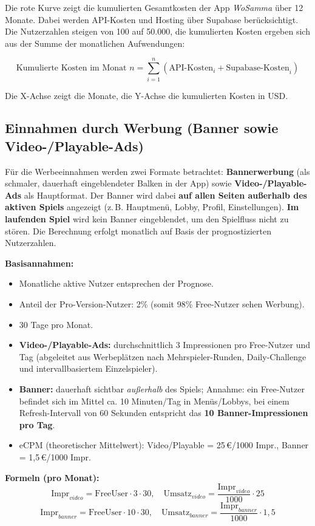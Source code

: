 Die rote Kurve zeigt die kumulierten Gesamtkosten der App \textit{WoSamma} über 12 Monate. 
Dabei werden API-Kosten und Hosting über Supabase berücksichtigt. 
Die Nutzerzahlen steigen von 100 auf 50.000, die kumulierten Kosten ergeben sich aus der Summe der monatlichen Aufwendungen:

\[
\text{Kumulierte Kosten im Monat } n = \sum_{i=1}^{n} (\text{API-Kosten}_i + \text{Supabase-Kosten}_i)
\]

Die X-Achse zeigt die Monate, die Y-Achse die kumulierten Kosten in USD.

\subsection{Einnahmen durch Werbung (Banner sowie Video-/Playable-Ads)}
Für die Werbeeinnahmen werden zwei Formate betrachtet: \textbf{Bannerwerbung} (als schmaler, dauerhaft eingeblendeter Balken in der App) sowie \textbf{Video-/Playable-Ads} als Hauptformat. Der Banner wird dabei \textbf{auf allen Seiten außerhalb des aktiven Spiels} angezeigt (z.\,B. Hauptmenü, Lobby, Profil, Einstellungen). \textbf{Im laufenden Spiel} wird kein Banner eingeblendet, um den Spielfluss nicht zu stören.
Die Berechnung erfolgt monatlich auf Basis der prognostizierten Nutzerzahlen.

\textbf{Basisannahmen:}
\begin{itemize}
    \item Monatliche aktive Nutzer entsprechen der Prognose.
    \item Anteil der Pro-Version-Nutzer: 2\% (somit 98\% Free-Nutzer sehen Werbung).
    \item 30 Tage pro Monat.
    \item \textbf{Video-/Playable-Ads:} durchschnittlich 3 Impressionen pro Free-Nutzer und Tag
    (abgeleitet aus Werbeplätzen nach Mehrspieler-Runden, Daily-Challenge und intervallbasiertem Einzelspieler).
    \item \textbf{Banner:} dauerhaft sichtbar \textit{außerhalb} des Spiels; Annahme: ein Free-Nutzer befindet sich im Mittel ca. 10 Minuten/Tag in Menüs/Lobbys,
    bei einem Refresh-Intervall von 60 Sekunden entspricht das \textbf{10 Banner-Impressionen pro Tag}.
    \item eCPM (theoretischer Mittelwert): Video/Playable = 25\,€/1000 Impr., Banner = 1{,}5\,€/1000 Impr.
\end{itemize}

\textbf{Formeln (pro Monat):}
\[
\text{Impr}_{video} = \text{FreeUser}\cdot 3 \cdot 30,\quad
\text{Umsatz}_{video} = \frac{\text{Impr}_{video}}{1000}\cdot 25
\]
\[
\text{Impr}_{banner} = \text{FreeUser}\cdot 10 \cdot 30,\quad
\text{Umsatz}_{banner} = \frac{\text{Impr}_{banner}}{1000}\cdot 1{,}5
\]

